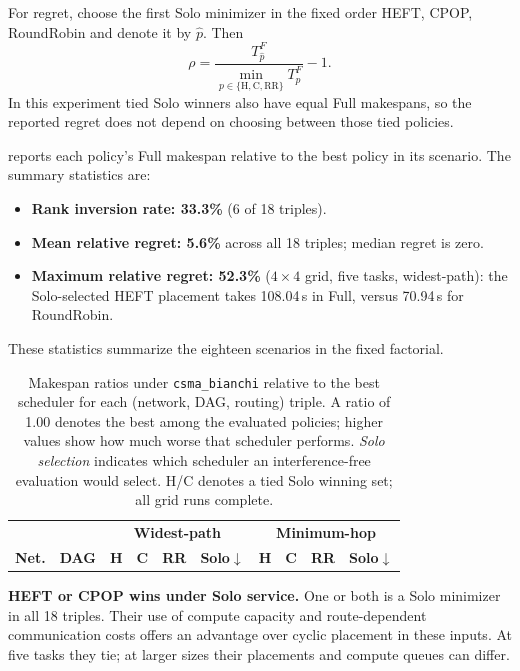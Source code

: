 \documentclass[conference]{IEEEtran}
\begin{document}
For regret, choose the first Solo minimizer in the fixed order HEFT, CPOP,
RoundRobin and denote it by $\widehat p$. Then
\begin{equation}
\rho=\frac{T_{\widehat p}^F}{\min_{p\in\{\mathrm{H,C,RR}\}}T_p^F}-1.
\label{eq:regret}
\end{equation}
In this experiment tied Solo winners also have equal Full makespans, so
the reported regret does not depend on choosing between those tied policies.

 reports each policy's Full makespan relative
to the best policy in its scenario. The summary statistics are:
\begin{itemize}[itemsep=1pt,leftmargin=*]
\item \textbf{Rank inversion rate: 33.3\%} (6 of 18 triples).
\item \textbf{Mean relative regret: 5.6\%} across all 18 triples;
  median regret is zero.
\item \textbf{Maximum relative regret: 52.3\%} ($4\times4$ grid,
  five tasks, widest-path): the Solo-selected HEFT placement takes
  108.04\,s in Full, versus 70.94\,s for RoundRobin.
\end{itemize}
These statistics summarize the eighteen scenarios in the fixed factorial.

\begin{table}[t]
\centering
\caption{Makespan ratios under \texttt{csma\_bianchi} relative to the best
  scheduler for each (network, DAG, routing) triple.  A ratio of 1.00
  denotes the best among the evaluated policies; higher values show how much worse that
  scheduler performs.  \emph{Solo selection} indicates which scheduler an
  interference-free evaluation would select.  H/C denotes a tied Solo winning set; all grid runs complete.}
\label{tab:winner_matrix}
\setlength{\tabcolsep}{3.5pt}
\begin{tabular}{@{}ll|rrrl|rrrl@{}}
\toprule
& & \multicolumn{4}{c|}{\textbf{Widest-path}} &
  \multicolumn{4}{c}{\textbf{Minimum-hop}} \\
\textbf{Net.} & \textbf{DAG} &
  \textbf{H} & \textbf{C} & \textbf{RR} & \textbf{Solo$\downarrow$} &
  \textbf{H} & \textbf{C} & \textbf{RR} & \textbf{Solo$\downarrow$} \\
\midrule

\bottomrule
\end{tabular}
\end{table}

\textbf{HEFT or CPOP wins under Solo service.}
One or both is a Solo minimizer in all 18 triples. Their use of compute
capacity and route-dependent communication costs offers an advantage over
cyclic placement in these inputs. At five tasks they tie; at larger sizes
their placements and compute queues can differ.
\end{document}
